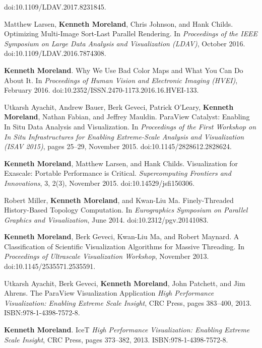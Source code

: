 \begin{enumerate}[label={[\arabic*]}, left=0pt]
  doi:10.1109/LDAV.2017.8231845.
\item  %
  Matthew Larsen, \textbf{Kenneth Moreland}, Chris Johnson, and Hank Childs.
  Optimizing Multi-Image Sort-Last Parallel Rendering.
  In \emph{Proceedings of the IEEE Symposium on Large Data Analysis and Visualization (LDAV)}, October 2016.
  doi:10.1109/LDAV.2016.7874308.
\item  %
  \textbf{Kenneth Moreland}.
  Why We Use Bad Color Maps and What You Can Do About It.
  In \emph{Proceedings of Human Vision and Electronic Imaging (HVEI)}, February 2016.
  doi:10.2352/ISSN.2470-1173.2016.16.HVEI-133.
\item  %
  Utkarsh Ayachit, Andrew Bauer, Berk Geveci, Patrick O'Leary, \textbf{Kenneth Moreland}, Nathan Fabian, and Jeffrey Mauldin.
  ParaView Catalyst: Enabling In Situ Data Analysis and Visualization.
  In \emph{Proceedings of the First Workshop on In Situ Infrastructures for Enabling Extreme-Scale Analysis and Visualization (ISAV 2015)}, pages 25--29, November 2015.
  doi:10.1145/2828612.2828624.
\item  %
  \textbf{Kenneth Moreland}, Matthew Larsen, and Hank Childs.
  Visualization for Exascale: Portable Performance is Critical.
  \emph{Supercomputing Frontiers and Innovations}, 3, 2(3), November 2015.
  doi:10.14529/jsfi150306.
\item  %
  Robert Miller, \textbf{Kenneth Moreland}, and Kwan-Liu Ma.
  Finely-Threaded History-Based Topology Computation.
  In \emph{Eurographics Symposium on Parallel Graphics and Visualization}, June 2014.
  doi:10.2312/pgv.20141083.
\item  %
  \textbf{Kenneth Moreland}, Berk Geveci, Kwan-Liu Ma, and Robert Maynard.
  A Classification of Scientific Visualization Algorithms for Massive Threading.
  In \emph{Proceedings of Ultrascale Visualization Workshop}, November 2013.
  doi:10.1145/2535571.2535591.
\item  %
  Utkarsh Ayachit, Berk Geveci, \textbf{Kenneth Moreland}, John Patchett, and Jim Ahrens.
  The ParaView Visualization Application  \emph{High Performance Visualization: Enabling Extreme Scale Insight}, CRC Press, pages 383--400, 2013.
  ISBN:978-1-4398-7572-8.
\item  %
  \textbf{Kenneth Moreland}.
  IceT  \emph{High Performance Visualization: Enabling Extreme Scale Insight}, CRC Press, pages 373--382, 2013.
  ISBN:978-1-4398-7572-8.
\item  %

\end{enumerate}
